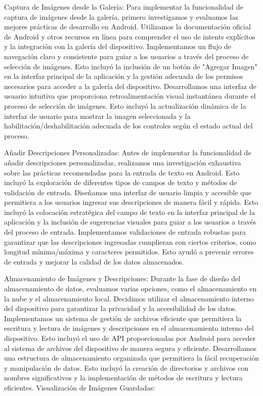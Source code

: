 \documentclass[conference]{IEEEtran}
\begin{document}
Captura de Imágenes desde la Galería:
Para implementar la funcionalidad de captura de imágenes desde la galería, primero investigamos y evaluamos las mejores prácticas de desarrollo en Android. Utilizamos la documentación oficial de Android y otros recursos en línea para comprender el uso de intents explícitos y la integración con la galería del dispositivo.
Implementamos un flujo de navegación claro y consistente para guiar a los usuarios a través del proceso de selección de imágenes. Esto incluyó la inclusión de un botón de "Agregar Imagen" en la interfaz principal de la aplicación y la gestión adecuada de los permisos necesarios para acceder a la galería del dispositivo.
Desarrollamos una interfaz de usuario intuitiva que proporciona retroalimentación visual instantánea durante el proceso de selección de imágenes. Esto incluyó la actualización dinámica de la interfaz de usuario para mostrar la imagen seleccionada y la habilitación/deshabilitación adecuada de los controles según el estado actual del proceso.

Añadir Descripciones Personalizadas:
Antes de implementar la funcionalidad de añadir descripciones personalizadas, realizamos una investigación exhaustiva sobre las prácticas recomendadas para la entrada de texto en Android. Esto incluyó la exploración de diferentes tipos de campos de texto y métodos de validación de entrada.
Diseñamos una interfaz de usuario limpia y accesible que permitiera a los usuarios ingresar sus descripciones de manera fácil y rápida. Esto incluyó la colocación estratégica del campo de texto en la interfaz principal de la aplicación y la inclusión de sugerencias visuales para guiar a los usuarios a través del proceso de entrada.
Implementamos validaciones de entrada robustas para garantizar que las descripciones ingresadas cumplieran con ciertos criterios, como longitud mínima/máxima y caracteres permitidos. Esto ayudó a prevenir errores de entrada y mejorar la calidad de los datos almacenados.

Almacenamiento de Imágenes y Descripciones:
Durante la fase de diseño del almacenamiento de datos, evaluamos varias opciones, como el almacenamiento en la nube y el almacenamiento local. Decidimos utilizar el almacenamiento interno del dispositivo para garantizar la privacidad y la accesibilidad de los datos.
Implementamos un sistema de gestión de archivos eficiente que permitiera la escritura y lectura de imágenes y descripciones en el almacenamiento interno del dispositivo. Esto incluyó el uso de API proporcionadas por Android para acceder al sistema de archivos del dispositivo de manera segura y eficiente.
Desarrollamos una estructura de almacenamiento organizada que permitiera la fácil recuperación y manipulación de datos. Esto incluyó la creación de directorios y archivos con nombres significativos y la implementación de métodos de escritura y lectura eficientes.
Visualización de Imágenes Guardadas:
\end{document}
